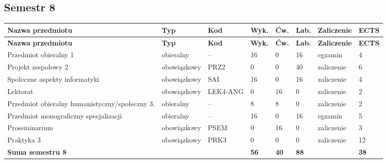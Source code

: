 \documentclass[12pt,a4paper]{article}
\newcommand{\thdrule}{\noalign{\global\setlength{\extrarowheight}{0pt}}}
\newcommand{\thdend}{\noalign{\global\setlength{\extrarowheight}{4pt}}}
\begin{document}
\subsection*{Semestr 8}

{\scriptsize
\begin{longtable}{>{\RaggedRight}m{5.0cm}m{1.9cm}m{0.75cm}m{0.85cm}m{0.85cm}m{0.85cm}m{1.45cm}m{0.9cm}}
\thdrule\toprule
\rowcolor{pjatkRed}
{\color{white}\footnotesize\textbf{\vphantom{Ag}Nazwa przedmiotu}} & {\color{white}\footnotesize\textbf{\vphantom{Ag}Typ}} & {\color{white}\footnotesize\textbf{\vphantom{Ag}Kod}} & {\color{white}\footnotesize\textbf{\vphantom{Ag}Wyk.}} & {\color{white}\footnotesize\textbf{\vphantom{Ag}Ćw.}} & {\color{white}\footnotesize\textbf{\vphantom{Ag}Lab.}} & {\color{white}\footnotesize\textbf{\vphantom{Ag}Zaliczenie}} & {\color{white}\footnotesize\textbf{\vphantom{Ag}ECTS}} \\
\midrule\thdend
\endfirsthead
\thdrule\toprule
\rowcolor{pjatkRed}
{\color{white}\footnotesize\textbf{\vphantom{Ag}Nazwa przedmiotu}} & {\color{white}\footnotesize\textbf{\vphantom{Ag}Typ}} & {\color{white}\footnotesize\textbf{\vphantom{Ag}Kod}} & {\color{white}\footnotesize\textbf{\vphantom{Ag}Wyk.}} & {\color{white}\footnotesize\textbf{\vphantom{Ag}Ćw.}} & {\color{white}\footnotesize\textbf{\vphantom{Ag}Lab.}} & {\color{white}\footnotesize\textbf{\vphantom{Ag}Zaliczenie}} & {\color{white}\footnotesize\textbf{\vphantom{Ag}ECTS}} \\
\midrule\thdend
\endhead
\rowcolor{tableElective} Przedmiot obieralny 1 & {\scriptsize obieralny} & -- & 16 & 0 & 16 & {\scriptsize egzamin} & 4 \\
\rowcolor{tableRowAlt} Projekt zespołowy 2 & {\scriptsize obowiązkowy} & PRZ2 & 0 & 0 & 40 & {\scriptsize zaliczenie} & 6 \\
\rowcolor{tableRowLight} Społeczne aspekty informatyki & {\scriptsize obowiązkowy} & SAI & 16 & 0 & 16 & {\scriptsize zaliczenie} & 4 \\
\rowcolor{tableRowAlt} Lektorat & {\scriptsize obowiązkowy} & LEK4-ANG & 0 & 16 & 0 & {\scriptsize zaliczenie} & 2 \\
\rowcolor{tableElective} Przedmiot obieralny humanistyczny/społeczny 3. & {\scriptsize obieralny} & -- & 8 & 8 & 0 & {\scriptsize zaliczenie} & 2 \\
\rowcolor{tableElective} Przedmiot monograficzny specjalizacji & {\scriptsize obieralny} & -- & 16 & 0 & 16 & {\scriptsize egzamin} & 5 \\
\rowcolor{tableRowLight} Proseminarium & {\scriptsize obowiązkowy} & PSEM & 0 & 16 & 0 & {\scriptsize zaliczenie} & 3 \\
\rowcolor{tableRowAlt} Praktyka 3 & {\scriptsize obowiązkowy} & PRK3 & 0 & 0 & 0 & {\scriptsize zaliczenie} & 12 \\
\midrule[\heavyrulewidth]
\rowcolor{tableSummary} \textbf{Suma semestru 8} & & & \textbf{56} & \textbf{40} & \textbf{88} & & \textbf{38} \\
\bottomrule
\end{longtable}}
\end{document}
